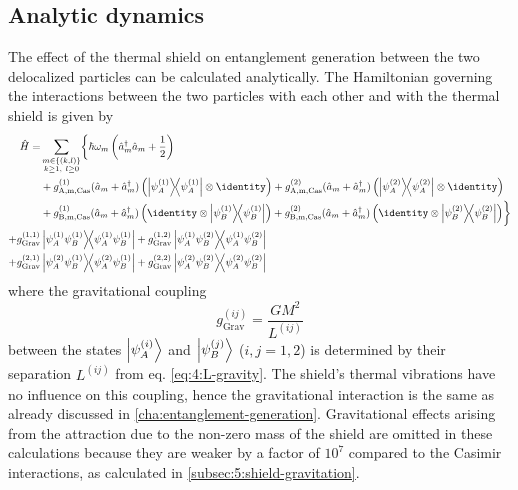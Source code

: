 \subsection{Analytic dynamics}\label{subsec:5:entanglement-analytical}
The effect of the thermal shield on entanglement generation between the two delocalized particles can be calculated analytically.
The Hamiltonian governing the interactions between the two particles with each other and with the thermal shield is given by
\begin{align}\label{eq:5:hamiltonian}
  \begin{split}
    \op{H} = &\sum_{\substack{m\in\{(k,l)\}\\ k \geq 1,\ l \geq 0}} \biggl\{ \hbar \omega_m \left(\op{a}^\dagger_m \op{a}_m + \frac{1}{2}\right) \\
    &+ g^{(1)}_\mathrm{A,m,Cas}(\op{a}_m + \op{a}^\dagger_m) \left( \ketbra{\psi^{(1)}_A} \otimes \identity \right)
     + g^{(2)}_\mathrm{A,m,Cas}(\op{a}_m + \op{a}^\dagger_m) \left( \ketbra{\psi^{(2)}_A} \otimes \identity \right) \\
    &+ g^{(1)}_\mathrm{B,m,Cas}(\op{a}_m + \op{a}^\dagger_m) \left( \identity \otimes \ketbra{\psi^{(1)}_B} \right)
     + g^{(2)}_\mathrm{B,m,Cas}(\op{a}_m + \op{a}^\dagger_m) \left( \identity \otimes \ketbra{\psi^{(2)}_B} \right)\biggr\} \\
    + g^{(1,1)}_\mathrm{Grav}&\ketbra{\psi^{(1)}_A \psi^{(1)}_B} + g^{(1,2)}_\mathrm{Grav}\ketbra{\psi^{(1)}_A \psi^{(2)}_B} \\
    + g^{(2,1)}_\mathrm{Grav}&\ketbra{\psi^{(2)}_A \psi^{(1)}_B} + g^{(2,2)}_\mathrm{Grav}\ketbra{\psi^{(2)}_A \psi^{(2)}_B}
  \end{split}
\end{align}
where the gravitational coupling
\begin{equation}
  g^{(ij)}_\mathrm{Grav} = \frac{G M^2}{L^{(ij)}}
\end{equation}
between the states $\ket{\psi^{(i)}_A}$ and $\ket{\psi^{(j)}_B}$ ($i,j = 1,2$) is determined by their separation $L^{(ij)}$ from eq. \eqref{eq:4:L-gravity}.
The shield's thermal vibrations have no influence on this coupling, hence the gravitational interaction is the same as already discussed in \cref{cha:entanglement-generation}.
Gravitational effects arising from the attraction due to the non-zero mass of the shield are omitted in these calculations because they are weaker by a factor of $10^7$ compared to the Casimir interactions, as calculated in \cref{subsec:5:shield-gravitation}.

